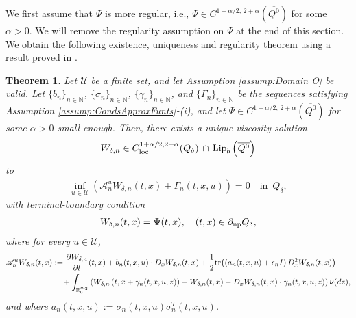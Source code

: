 \documentclass[amscd,amssymb,11pt]{article}
\newtheorem{theorem}{Theorem}
\numberwithin{theorem}{section}
\numberwithin{equation}{section}
\begin{document}
We first assume that $\Psi$ is more regular, i.e., $\Psi\in C^{1+\alpha/2,\,2+\alpha}(\overline{Q^{0}})$ for some $\alpha>0$. We will remove the regularity assumption on $\Psi$ at the end of this section. We obtain the following existence, uniqueness and regularity theorem using a result proved in \cite{Mou1:2016}.
\begin{theorem}\label{thm:uer}
Let $\mathcal{U}$ be a finite set, and let Assumption \ref{assump:Domain O} be valid. Let $\{b_{n}\}_{n\in\mathbb{N}}$, $\{\sigma_{n}\}_{n\in\mathbb{N}}$, $\{\gamma_{n}\}_{n\in\mathbb{N}}$, and $\{\Gamma_{n}\}_{n\in\mathbb{N}}$ be the sequences satisfying Assumption \ref{assump:CondsApproxFunts}-(i), and let $\Psi\in C^{1+\alpha/2,\,2+\alpha}(\overline{Q^{0}})$ for some $\alpha>0$ small enough. Then, there exists a unique viscosity solution
\begin{align*}
W_{\delta,n}\in C^{1+\alpha/2,2+\alpha}_{\rm loc}(Q_{\delta})\,\cap\,{\rm Lip}_{b}\left(\overline{Q^{0}}\right)
\end{align*}
to
\begin{align}\label{eq:HJBDeltan}
\inf_{u\in\mathcal{U}}\left(\mathscr{A}_{n}^{u}W_{\delta,n}(t,x)+\Gamma_{n}(t,x,u)\right)=0\quad\text{in }\,Q_{\delta},
\end{align}
with terminal-boundary condition
\begin{align*}
W_{\delta,n}(t,x)=\Psi(t,x),\quad (t,x)\in\partial_{{\rm np}}Q_{\delta},
\end{align*}
where for every $u\in\mathcal{U}$,
\begin{align*}
\mathscr{A}_{n}^{u}W_{\delta,n}(t,x)&:=\frac{\partial W_{\delta,n}}{\partial t}(t,x)+b_{n}(t,x,u)\cdot D_{x}W_{\delta,n}(t,x)+\frac{1}{2}{\rm tr}\!\left(\left(a_{n}(t,x,u)+\epsilon_{n}I\right)D_{x}^{2}W_{\delta,n}(t,x)\right)\\ &\quad\,+\int_{\mathbb{R}^{m_{2}}_{0}}\left(W_{\delta,n}\left(t,x+\gamma_{n}(t,x,u,z)\right)-W_{\delta,n}(t,x)-D_{x}W_{\delta,n}(t,x)\cdot\gamma_{n}(t,x,u,z)\right)\nu(dz),
\end{align*}
and where $a_{n}(t,x,u):=\sigma_{n}(t,x,u)\sigma_{n}^{T}(t,x,u)$.
\end{theorem}
\end{document}
